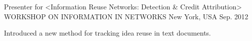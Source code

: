 

\begin{cventries}

  \cventry
    {Presenter for <Information Reuse Networks: Detection \& Credit Attribution>} %
    {WORKSHOP ON INFORMATION IN NETWORKS} %
    {New York, USA} %
    {Sep. 2012} %
    {
      \begin{cvitems} %
        \item {Introduced a new method for tracking idea reuse in text documents.}
      \end{cvitems}
    }

\end{cventries}
